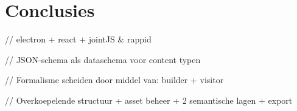 \chapter{Conclusies}
\label{ch:conclusion}

// electron + react + jointJS \& rappid

// JSON-schema als dataschema voor content typen

// Formalisme scheiden door middel van: builder + visitor

// Overkoepelende structuur + asset beheer + 2 semantische lagen + export